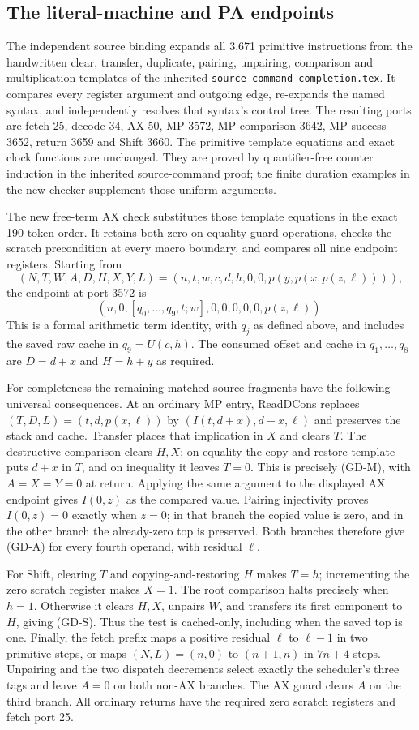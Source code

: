 \subsection{The literal-machine and PA endpoints}

The independent source binding expands all 3,671 primitive instructions
from the handwritten clear, transfer, duplicate, pairing, unpairing,
comparison and multiplication templates of the inherited
\texttt{source\_command\_completion.tex}. It compares every register
argument and outgoing edge, re-expands the named syntax, and independently
resolves that syntax's control tree. The resulting ports are fetch 25,
decode 34, AX 50, MP 3572, MP comparison 3642, MP success 3652,
return 3659 and Shift 3660. The primitive template equations and exact
clock functions are unchanged. They are proved by quantifier-free counter
induction in the inherited source-command proof; the finite duration
examples in the new checker supplement those uniform arguments.

The new free-term AX check substitutes those template equations in the
exact 190-token order. It retains both zero-on-equality guard operations,
checks the scratch precondition at every macro boundary, and compares
all nine endpoint registers. Starting from
\[
 (N,T,W,A,D,H,X,Y,L)
   =(n,t,w,c,d,h,0,0,p(y,p(x,p(z,\ell)))),
\]
the endpoint at port 3572 is
\[
 (n,0,[q_0,\ldots,q_9,t;w],0,0,0,0,0,p(z,\ell)).
\]
This is a formal arithmetic term identity, with $q_j$ as defined above,
and includes the saved raw cache in $q_9=U(c,h)$. The consumed offset
and cache in $q_1,\ldots,q_8$ are $D=d+x$ and $H=h+y$ as required.

For completeness the remaining matched source fragments have the
following universal consequences. At an ordinary MP entry, ReadDCons
replaces $(T,D,L)=(t,d,p(x,\ell))$ by
$(I(t,d+x),d+x,\ell)$ and preserves the stack and cache. Transfer places
that implication in $X$ and clears $T$. The destructive comparison clears
$H,X$; on equality the copy-and-restore template puts $d+x$ in $T$,
and on inequality it leaves $T=0$. This is precisely (GD-M), with
$A=X=Y=0$ at return. Applying the same argument to the displayed AX
endpoint gives $I(0,z)$ as the compared value. Pairing injectivity proves
$I(0,z)=0$ exactly when $z=0$; in that branch the copied value is zero,
and in the other branch the already-zero top is preserved. Both branches
therefore give (GD-A) for every fourth operand, with residual $\ell$.

For Shift, clearing $T$ and copying-and-restoring $H$ makes $T=h$;
incrementing the zero scratch register makes $X=1$. The root comparison
halts precisely when $h=1$. Otherwise it clears $H,X$, unpairs $W$, and
transfers its first component to $H$, giving (GD-S). Thus the test is
cached-only, including when the saved top is one. Finally, the fetch
prefix maps a positive residual $\ell$ to $\ell-1$ in two primitive
steps, or maps $(N,L)=(n,0)$ to $(n+1,n)$ in $7n+4$ steps. Unpairing
and the two dispatch decrements select exactly the scheduler's three
tags and leave $A=0$ on both non-AX branches. The AX guard clears $A$
on the third branch. All ordinary returns have the required zero scratch
registers and fetch port 25.

